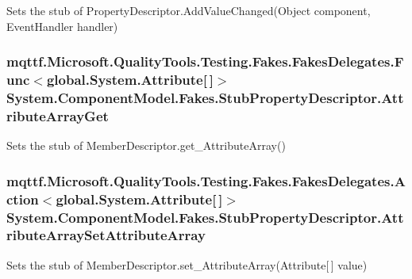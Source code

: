 Sets the stub of Property\-Descriptor.\-Add\-Value\-Changed(\-Object component, Event\-Handler handler)

\hypertarget{class_system_1_1_component_model_1_1_fakes_1_1_stub_property_descriptor_acf26986bc6e5c8de692e4f3e044cc0cf}{
\subsubsection[{Attribute\-Array\-Get}]{\setlength{\rightskip}{0pt plus 5cm}mqttf.\-Microsoft.\-Quality\-Tools.\-Testing.\-Fakes.\-Fakes\-Delegates.\-Func$<$global.\-System.\-Attribute\mbox{[}$\,$\mbox{]}$>$ System.\-Component\-Model.\-Fakes.\-Stub\-Property\-Descriptor.\-Attribute\-Array\-Get}}\label{class_system_1_1_component_model_1_1_fakes_1_1_stub_property_descriptor_acf26986bc6e5c8de692e4f3e044cc0cf}


Sets the stub of Member\-Descriptor.\-get\-\_\-\-Attribute\-Array()

\hypertarget{class_system_1_1_component_model_1_1_fakes_1_1_stub_property_descriptor_ac74288cc2567f02e424bef175602622c}{
\subsubsection[{Attribute\-Array\-Set\-Attribute\-Array}]{\setlength{\rightskip}{0pt plus 5cm}mqttf.\-Microsoft.\-Quality\-Tools.\-Testing.\-Fakes.\-Fakes\-Delegates.\-Action$<$global.\-System.\-Attribute\mbox{[}$\,$\mbox{]}$>$ System.\-Component\-Model.\-Fakes.\-Stub\-Property\-Descriptor.\-Attribute\-Array\-Set\-Attribute\-Array}}\label{class_system_1_1_component_model_1_1_fakes_1_1_stub_property_descriptor_ac74288cc2567f02e424bef175602622c}


Sets the stub of Member\-Descriptor.\-set\-\_\-\-Attribute\-Array(\-Attribute\mbox{[}$\,$\mbox{]} value)

